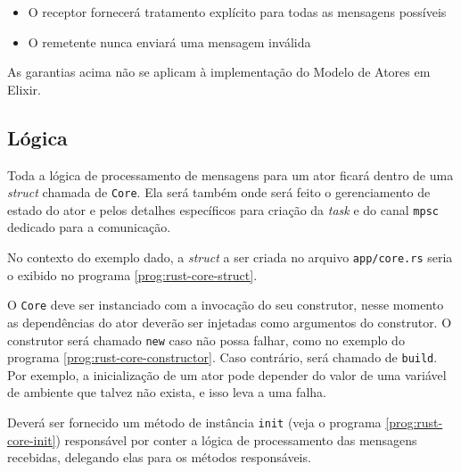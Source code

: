 \begin{itemize}
    \item O receptor fornecerá tratamento explícito para todas as mensagens possíveis
    \item O remetente nunca enviará uma mensagem inválida
\end{itemize}

As garantias acima não se aplicam à implementação do Modelo de Atores em Elixir. 

\subsection{Lógica}

Toda a lógica de processamento de mensagens para um ator ficará dentro de uma \emph{struct} chamada de \texttt{Core}. Ela será também onde será feito o gerenciamento de estado do ator e pelos detalhes específicos para criação da \emph{task} e do canal \texttt{mpsc} dedicado para a comunicação.

No contexto do exemplo dado, a \emph{struct} a ser criada no arquivo \texttt{app/core.rs} seria o exibido no programa \ref{prog:rust-core-struct}.

\begin{program}
  
  \caption{Exemplo de struct Core para lógica do ator.\label{prog:rust-core-struct}}
\end{program}


O \texttt{Core} deve ser instanciado com a invocação do seu construtor, nesse momento as dependências do ator deverão ser injetadas como argumentos do construtor. O construtor será chamado \texttt{new} caso não possa falhar, como no exemplo do programa \ref{prog:rust-core-constructor}. Caso contrário, será chamado de \texttt{build}. Por exemplo, a inicialização de um ator pode depender do valor de uma variável de ambiente que talvez não exista, e isso leva a uma falha.

\begin{program}
  
  \caption{Exemplo de construtor.\label{prog:rust-core-constructor}}
\end{program}

Deverá ser fornecido um método de instância \texttt{init} (veja o programa \ref{prog:rust-core-init}) responsável por conter a lógica de processamento das mensagens recebidas, delegando elas para os métodos responsáveis.

